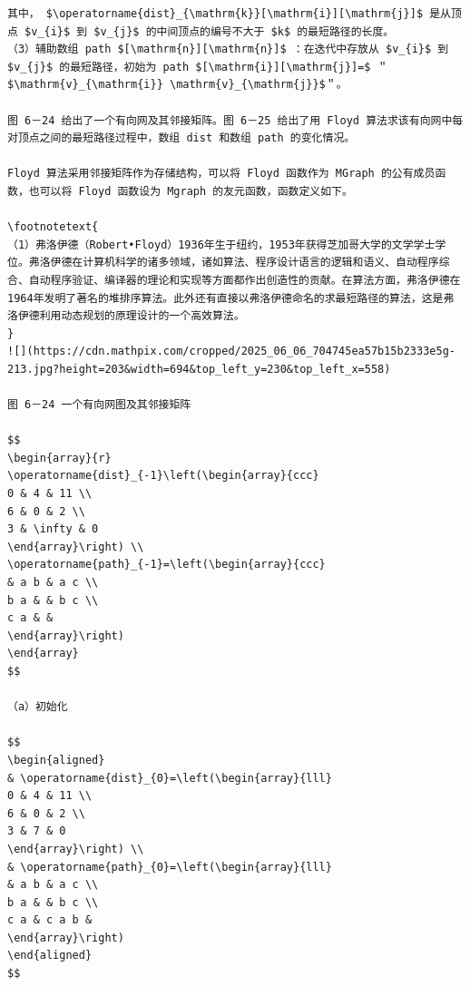 \documentclass[10pt]{article}
\let\svthefootnote\thefootnote
\newcommand\blfootnotetext[1]{%
  \let\thefootnote\relax\footnote{#1}%
  \addtocounter{footnote}{-1}%
  \let\thefootnote\svthefootnote%
}
\let\svfootnotetext\footnotetext
\renewcommand\footnotetext[2][?]{%
  \if\relax#1\relax%
    \ifnum\value{footnote}=0\blfootnotetext{#2}\else\svfootnotetext{#2}\fi%
  \else%
    \if?#1\ifnum\value{footnote}=0\blfootnotetext{#2}\else\svfootnotetext{#2}\fi%
    \else\svfootnotetext[#1]{#2}\fi%
  \fi
}
\begin{document}
\begin{verbatim}
其中， $\operatorname{dist}_{\mathrm{k}}[\mathrm{i}][\mathrm{j}]$ 是从顶点 $v_{i}$ 到 $v_{j}$ 的中间顶点的编号不大于 $k$ 的最短路径的长度。
（3）辅助数组 path $[\mathrm{n}][\mathrm{n}]$ ：在迭代中存放从 $v_{i}$ 到 $v_{j}$ 的最短路径，初始为 path $[\mathrm{i}][\mathrm{j}]=$ ＂ $\mathrm{v}_{\mathrm{i}} \mathrm{v}_{\mathrm{j}}$＂。

图 6－24 给出了一个有向网及其邻接矩阵。图 6－25 给出了用 Floyd 算法求该有向网中每对顶点之间的最短路径过程中，数组 dist 和数组 path 的变化情况。

Floyd 算法采用邻接矩阵作为存储结构，可以将 Floyd 函数作为 MGraph 的公有成员函数，也可以将 Floyd 函数设为 Mgraph 的友元函数，函数定义如下。

\footnotetext{
（1）弗洛伊德（Robert•Floyd）1936年生于纽约，1953年获得芝加哥大学的文学学士学位。弗洛伊德在计算机科学的诸多领域，诸如算法、程序设计语言的逻辑和语义、自动程序综合、自动程序验证、编译器的理论和实现等方面都作出创造性的贡献。在算法方面，弗洛伊德在1964年发明了著名的堆排序算法。此外还有直接以弗洛伊德命名的求最短路径的算法，这是弗洛伊德利用动态规划的原理设计的一个高效算法。
}
![](https://cdn.mathpix.com/cropped/2025_06_06_704745ea57b15b2333e5g-213.jpg?height=203&width=694&top_left_y=230&top_left_x=558)

图 6－24 一个有向网图及其邻接矩阵

$$
\begin{array}{r}
\operatorname{dist}_{-1}\left(\begin{array}{ccc}
0 & 4 & 11 \\
6 & 0 & 2 \\
3 & \infty & 0
\end{array}\right) \\
\operatorname{path}_{-1}=\left(\begin{array}{ccc} 
& a b & a c \\
b a & & b c \\
c a & &
\end{array}\right)
\end{array}
$$

（a）初始化

$$
\begin{aligned}
& \operatorname{dist}_{0}=\left(\begin{array}{lll}
0 & 4 & 11 \\
6 & 0 & 2 \\
3 & 7 & 0
\end{array}\right) \\
& \operatorname{path}_{0}=\left(\begin{array}{lll} 
& a b & a c \\
b a & & b c \\
c a & c a b &
\end{array}\right)
\end{aligned}
$$


\end{verbatim}
\end{document}
